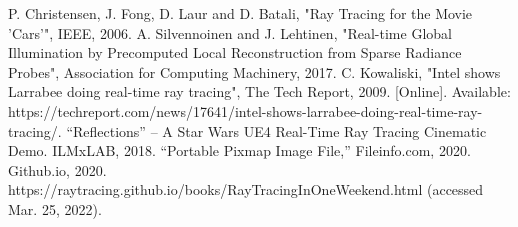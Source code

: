\documentclass[conference]{IEEEtran}
\begin{document}
\begin{thebibliography}{00}
 P. Christensen, J. Fong, D. Laur and D. Batali, "Ray Tracing for the Movie 'Cars'", IEEE, 2006.
 A. Silvennoinen and J. Lehtinen, "Real-time Global Illumination by Precomputed Local Reconstruction from Sparse Radiance Probes", Association for Computing Machinery, 2017.
 C. Kowaliski, "Intel shows Larrabee doing real-time ray tracing", The Tech Report, 2009. [Online]. Available: https://techreport.com/news/17641/intel-shows-larrabee-doing-real-time-ray-tracing/.
 “Reflections” – A Star Wars UE4 Real-Time Ray Tracing Cinematic Demo. ILMxLAB, 2018.
 “Portable Pixmap Image File,” Fileinfo.com, 2020.
 Github.io, 2020. https://raytracing.github.io/books/RayTracingInOneWeekend.html (accessed Mar. 25, 2022).
\end{thebibliography}
\end{document}
